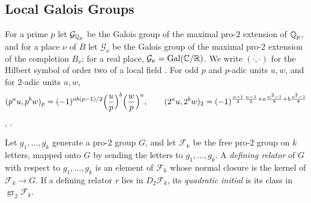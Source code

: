 \subsection{Local Galois Groups}\label{tw:local-section}
For a prime $p$ let $\mathcal G_{\mathbb Q_p}$ be the Galois group of the maximal
pro-$2$ extension of $\mathbb Q_p$, and for a place $\nu$ of $B$ let $\mathcal G_\nu$
be the Galois group of the maximal pro-$2$ extension of the completion
$B_\nu$; for a real place, $\mathcal G_\nu=\operatorname{Gal}(\mathbb C/\mathbb R)$. We write
$(\cdot,\cdot)$ for the Hilbert symbol
of order two of a local field \cite[Chapter~III, Section~4]{MilneCFT}. For
odd $p$ and $p$-adic units $u,w$, and for $2$-adic units $u,w$,
\begin{equation}\label{tw:hilbert}
 (p^au,p^bw)_p=(-1)^{ab(p-1)/2}\Bigl(\frac up\Bigr)^b\Bigl(\frac wp\Bigr)^a,
 \qquad
 (2^au,2^bw)_2=(-1)^{\frac{u-1}2\frac{w-1}2+a\frac{w^2-1}8+b\frac{u^2-1}8}
\end{equation}
\cite[Chapter~III, Theorem~1]{SerreCourse}, \cite[Chapter~VIII,
Section~5]{MilneCFT}.

\begin{definition}\label{tw:relator}
Let $g_1,\dots,g_k$ generate a pro-$2$ group $G$, and let $\mathcal F_k$ be
the free pro-$2$ group on $k$ letters, mapped onto $G$ by sending the letters
to $g_1,\dots,g_k$. A \emph{defining relator} of $G$ with respect to
$g_1,\dots,g_k$ is an element of $\mathcal F_k$ whose normal closure is the
kernel of $\mathcal F_k\to G$. If a defining relator $r$ lies in
$D_2\mathcal F_k$, its \emph{quadratic initial} is its class in
$\operatorname{gr}_2\mathcal F_k$.
\end{definition}

